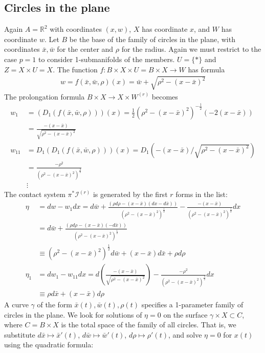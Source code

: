 \documentclass[12pt]{article}
\numberwithin{equation}{section}
\theoremstyle{plain}
\theoremstyle{definition}
\newcommand{\R}{\mathbb{R}}
\newcommand{\ra}{\rightarrow}
\begin{document}
\subsection{Circles in the plane}\label{circlesintheplane}
Again $A=\R^{2}$ with coordinates $(x,w)$, $X$ has coordinate $x$, and $W$ has coordinate $w$. Let $B$ be the base of the family of circles in the plane, with coordinates $\bar{x},\bar{w}$ for the center and $\rho$ for the radius. Again we must restrict to the case $p=1$ to consider 1-submanifolds of the members. $U=\{*\}$ and $Z=X\times U=X$. The function $f:B\times X\times U=B\times X\ra W$ has formula
\begin{align*}
w=f(\bar{x},\bar{w},\rho)(x)=\bar{w}+\sqrt{\rho^{2}-(x-\bar{x})^{2}}
\end{align*}
The prolongation formula $B\times X\ra X\times W^{(r)}$ becomes
\begin{align*}
w_{1}&=(D_{1}(f(\bar{x},\bar{w},\rho)))(x)=\tfrac{1}{2}(\rho^{2}-(x-\bar{x})^{2})^{-\frac{1}{2}}(-2(x-\bar{x}))\\
&=\frac{-(x-\bar{x})}{\sqrt{\rho^{2}-(x-\bar{x})^{2}}}\\
w_{11}&=D_{1}(D_{1}(f(\bar{x},\bar{w},\rho)))(x)=D_{1}(-(x-\bar{x})/\sqrt{\rho^{2}-(x-\bar{x})^{2}})\\
&=\frac{-\rho^{2}}{(\rho^{2}-(x-\bar{x})^{2})^{\tfrac{3}{2}}}\\
&\vdots
\end{align*}
The contact system $\pi^{*}\mathcal{I}^{(r)}$ is generated by the first $r$ forms in the list:
\begin{align*}
\eta&=dw-w_{1}dx=d\bar{w}+\frac{(\rho d\rho-(x-\bar{x})(dx-d\bar{x}))}{(\rho^{2}-(x-\bar{x})^{2})^{\frac{1}{2}}}-\frac{-(x-\bar{x})}{(\rho^{2}-(x-\bar{x})^{2})^{\frac{1}{2}}}dx\\
&=d\bar{w}+\frac{(\rho d\rho-(x-\bar{x})(-d\bar{x}))}{(\rho^{2}-(x-\bar{x})^{2})^{\frac{1}{2}}}\\
&\equiv (\rho^{2}-(x-\bar{x})^{2})^{\frac{1}{2}}d\bar{w}+ (x-\bar{x})d\bar{x}+ \rho d \rho\\
\eta_{1}&=dw_{1}-w_{11}dx=d\left(\frac{-(x-\bar{x})}{\sqrt{\rho^{2}-(x-\bar{x})^{2}}}\right)-\frac{-\rho^{2}}{(\rho^{2}-(x-\bar{x})^{2})^{\tfrac{3}{2}}}dx\\
&\equiv\rho d\bar{x}+(x-\bar{x})d\rho
\end{align*}
A curve $\gamma$ of the form $\bar{x}(t),\bar{w}(t),\rho(t)$ specifies a 1-parameter family of circles in the plane. We look for solutions of $\eta=0$ on the surface $\gamma \times X \subset C$, where $C=B\times X$ is the total space of the family of all circles. That is, we substitute $d\bar{x}\mapsto \bar{x}'(t)$, $d\bar{w}\mapsto \bar{w}'(t)$, $d\rho\mapsto \rho'(t)$, and solve $\eta=0$ for $x(t)$ using the quadratic formula:
\end{document}
